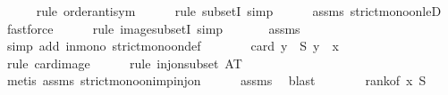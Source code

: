 \begin{isabellebody}
\ \ \ \ \isamarkupfalse%
\ {\isacharparenleft}{\kern0pt}rule\ order{\isacharunderscore}{\kern0pt}antisym{\isacharparenright}{\kern0pt}\isanewline
\ \ \ \ \isamarkupfalse%
\ {\isacharparenleft}{\kern0pt}rule\ subsetI{\isacharcomma}{\kern0pt}\ simp{\isacharparenright}{\kern0pt}\isanewline
\ \ \ \ \isamarkupfalse%
\ assms\ strict{\isacharunderscore}{\kern0pt}mono{\isacharunderscore}{\kern0pt}on{\isacharunderscore}{\kern0pt}leD\ \isamarkupfalse%
\ fastforce\isanewline
\ \ \ \ \isamarkupfalse%
\ {\isacharparenleft}{\kern0pt}rule\ image{\isacharunderscore}{\kern0pt}subsetI{\isacharcomma}{\kern0pt}\ simp{\isacharparenright}{\kern0pt}\ \isanewline
\ \ \ \ \isamarkupfalse%
\ assms\ \isamarkupfalse%
\ {\isacharparenleft}{\kern0pt}simp\ add{\isacharcolon}{\kern0pt}\ in{\isacharunderscore}{\kern0pt}mono\ strict{\isacharunderscore}{\kern0pt}mono{\isacharunderscore}{\kern0pt}on{\isacharunderscore}{\kern0pt}def{\isacharparenright}{\kern0pt}\isanewline
\ \ \isamarkupfalse%
\ \isamarkupfalse%
\ {\isachardoublequoteopen}{\isachardot}{\kern0pt}{\isachardot}{\kern0pt}{\isachardot}{\kern0pt}\ {\isacharequal}{\kern0pt}\ card\ {\isacharbraceleft}{\kern0pt}y\ {\isasymin}\ S{\isachardot}{\kern0pt}\ y\ {\isacharless}{\kern0pt}\ x{\isacharbraceright}{\kern0pt}{\isachardoublequoteclose}\isanewline
\ \ \ \ \isamarkupfalse%
\ {\isacharparenleft}{\kern0pt}rule\ card{\isacharunderscore}{\kern0pt}image{\isacharparenright}{\kern0pt}\isanewline
\ \ \ \ \isamarkupfalse%
\ {\isacharparenleft}{\kern0pt}rule\ inj{\isacharunderscore}{\kern0pt}on{\isacharunderscore}{\kern0pt}subset{\isacharbrackleft}{\kern0pt}\ A{\isacharequal}{\kern0pt}{\isachardoublequoteopen}T{\isachardoublequoteclose}{\isacharbrackright}{\kern0pt}{\isacharparenright}{\kern0pt}\isanewline
\ \ \ \ \ \isamarkupfalse%
\ {\isacharparenleft}{\kern0pt}metis\ assms{\isacharparenleft}{\kern0pt}{}{\isacharparenright}{\kern0pt}\ strict{\isacharunderscore}{\kern0pt}mono{\isacharunderscore}{\kern0pt}on{\isacharunderscore}{\kern0pt}imp{\isacharunderscore}{\kern0pt}inj{\isacharunderscore}{\kern0pt}on{\isacharparenright}{\kern0pt}\isanewline
\ \ \ \ \isamarkupfalse%
\ assms\ \isamarkupfalse%
\ blast\isanewline
\ \ \isamarkupfalse%
\ \isamarkupfalse%
\ {\isachardoublequoteopen}{\isachardot}{\kern0pt}{\isachardot}{\kern0pt}{\isachardot}{\kern0pt}\ {\isacharequal}{\kern0pt}\ rank{\isacharunderscore}{\kern0pt}of\ x\ S{\isachardoublequoteclose}\isanewline

\end{isabellebody}
